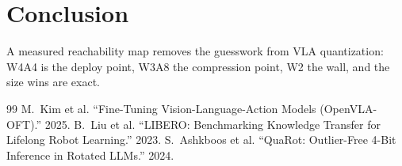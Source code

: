 \documentclass[conference]{IEEEtran}
\begin{document}
\section{Conclusion}
A measured reachability map removes the guesswork from VLA quantization: W4A4 is the deploy
point, W3A8 the compression point, W2 the wall, and the size wins are exact.

\begin{thebibliography}{99}
\small
{} M.~Kim et al. ``Fine-Tuning Vision-Language-Action Models (OpenVLA-OFT).'' 2025.
 B.~Liu et al. ``LIBERO: Benchmarking Knowledge Transfer for Lifelong Robot Learning.'' 2023.
 S.~Ashkboos et al. ``QuaRot: Outlier-Free 4-Bit Inference in Rotated LLMs.'' 2024.
\end{thebibliography}
\end{document}
